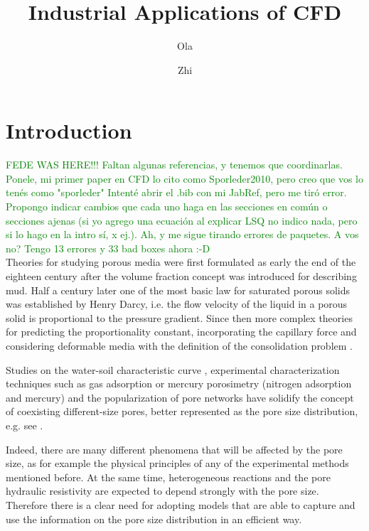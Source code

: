 \documentclass{CFD2011}
\title{Industrial Applications of CFD}
\author{Ola}{Nordmann} %
\author{Zhi}{L. Xie}
\newcommand{\Fede}[1]{\textcolor{green}{#1} \\}
\begin{document}
\maketitle  %
\headers   %

\newpage

\section{Introduction}
\Fede{FEDE WAS HERE!!! Faltan algunas referencias, y tenemos que coordinarlas. Ponele, mi primer paper en CFD lo cito como Sporleder2010, pero creo que vos lo ten\'es como "sporleder" Intent\'e abrir el .bib con mi JabRef, pero me tir\'o error. Propongo indicar cambios que cada uno haga en las secciones en com\'un o secciones ajenas (si yo agrego una ecuaci\'on al explicar LSQ no indico nada, pero si lo hago en la intro s\'i, x ej.). Ah, y me sigue tirando errores de paquetes. A vos no? Tengo 13 errores y 33 bad boxes ahora :-D }

Theories for studying porous media were first formulated as early the end of the eighteen century after the volume fraction concept was introduced for describing mud. Half a century later one of the most basic law for saturated porous solids was established by Henry Darcy, i.e. the flow velocity of the liquid in a porous solid is proportional to the pressure gradient. Since then more complex theories for predicting the proportionality constant, incorporating the capillary force and considering deformable media with the definition of the consolidation problem \citep{Boer1992}. 

Studies on the water-soil characteristic curve \citep{durner1994}, experimental characterization techniques such as gas adsorption or mercury porosimetry \citep{Navas,Jaroniec1997,Abell1999}(nitrogen adsorption and mercury) and the popularization of pore networks \citep{zhang1994, held2001, blunt2002, piri2005, ahrenholz2008, sholokhova2009} have solidify the concept of coexisting different-size pores, better represented as the pore size distribution, e.g. see \cite{dullien1991}.

Indeed, there are many different phenomena that will be affected by the pore size, as for example the physical principles of any of the experimental methods mentioned before. At the same time, heterogeneous reactions and the pore hydraulic resistivity are expected to depend strongly with the pore size. Therefore there is a clear need for adopting models that are able to capture and use the information on the pore size distribution in an efficient way.
\end{document}
